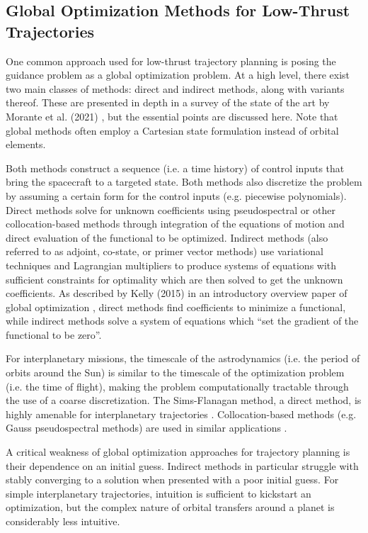 \subsection{Global Optimization Methods for Low-Thrust Trajectories}

One common approach used for low-thrust trajectory planning is posing the guidance problem as a global optimization problem. At a high level, there exist two main classes of methods: direct and indirect methods, along with variants thereof. These are presented in depth in a survey of the state of the art by Morante et al. (2021) \cite{morante2021survey}, but the essential points are discussed here. Note that global methods often employ a Cartesian state formulation instead of orbital elements.

Both methods construct a sequence (i.e. a time history) of control inputs that bring the spacecraft to a targeted state. Both methods also discretize the problem by assuming a certain form for the control inputs (e.g. piecewise polynomials). Direct methods solve for unknown coefficients using pseudospectral or other collocation-based methods through integration of the equations of motion and direct evaluation of the functional to be optimized. Indirect methods (also referred to as adjoint, co-state, or primer vector methods) use variational techniques and Lagrangian multipliers to produce systems of equations with sufficient constraints for optimality which are then solved to get the unknown coefficients. As described by Kelly (2015) in an introductory overview paper of global optimization \cite{kelly2015transcription}, direct methods find coefficients to minimize a functional, while indirect methods solve a system of equations which ``set the gradient of the functional to be zero''.

For interplanetary missions, the timescale of the astrodynamics (i.e. the period of orbits around the Sun) is similar to the timescale of the optimization problem (i.e. the time of flight), making the problem computationally tractable through the use of a coarse discretization. The Sims-Flanagan method, a direct method, is highly amenable for interplanetary trajectories \cite{sims1997preliminary, yam2011low}. Collocation-based methods (e.g. Gauss pseudospectral methods) are used in similar applications \cite{fahroo2002direct, narayanaswamy2020comparison}.

A critical weakness of global optimization approaches for trajectory planning is their dependence on an initial guess. Indirect methods in particular struggle with stably converging to a solution when presented with a poor initial guess. For simple interplanetary trajectories, intuition is sufficient to kickstart an optimization, but the complex nature of orbital transfers around a planet is considerably less intuitive.

